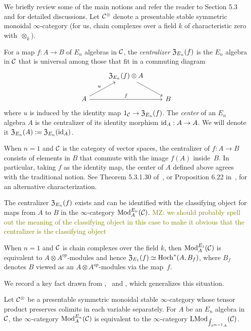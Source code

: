 \documentclass[11pt]{amsart}
\numberwithin{equation}{section}
\def\mahmoud{\textcolor{olive}{MZ: }\textcolor{olive}}
\begin{document}
We briefly review some of the main notions and refer the reader to \cite{LurieHA} Section 5.3 and \cite{FrancisHH} for detailed discussions. Let $\mathcal C^\otimes$ denote a presentable stable symmetric monoidal $\infty$-category (for us, chain complexes over a field $k$ of characteristic zero with~$\otimes_k$).

\begin{dfn}\label{D:centralizer}
For a map $f: A \to B$ of $E_n$ algebras in $\mathcal C$, 
the {\em centralizer} ${\frak Z}_{E_n}(f)$ is the $E_n$ algebra in $\mathcal C$ that is universal among those that fit in a commuting diagram
\[
\begin{tikzcd}
& {\frak Z}_{E_n}(f) \otimes A \arrow[dr] & \\
A \arrow[ur, "u"] \arrow[rr, "f"] && B
\end{tikzcd}
\]
where $u$ is induced by the identity map $1_\mathcal C \to {\frak Z}_{E_n}(f)$.
The {\em center} of an $E_n$ algebra $A$ is the centralizer of its identity morphism ${\rm id}_A: A \to A$. We will denote it ${\frak Z}_{E_n}(A) 
:= {\frak Z}_{E_n}({\rm id}_A)$.
\end{dfn}

When $n=1$ and $\mathcal C$ is the category of vector spaces, 
the centralizer of $f: A \to B$ consists of elements in $B$ that commute with the image $f(A)$ inside~$B$. 
In particular, taking $f$ as the identity map, 
the center of $A$ defined above agrees with the traditional notion. 
See Theorem 5.3.1.30 of~\cite{LurieHA}, or Proposition 6.22 in~\cite{GTZ3}, for an alternative characterization.

\begin{prp}\label{T:centralizer=inthom} 
The centralizer ${\frak Z}_{E_n}(f)$ exists and can be identified with the classifying object for maps from $A$ to $B$ in the $\infty$-category ${\rm Mod}^{E_n}_A(\mathcal C)$. \mahmoud{we should probably spell out the meaning of the classifying object in this case to make it obvious that the centralizer is the classifying object}
\end{prp} 

When $n=1$ and $\mathcal C$ is chain complexes over the field $k$, then ${\rm Mod}^{E_1}_A(\mathcal C)$ is equivalent to $A\otimes A^{op}$-modules and hence ${\frak Z}_{E_1}(f) \simeq {\rm Hoch}^*(A,B_f)$,
where $B_f$ denotes $B$ viewed as an $A\otimes A^{op}$-modules via the map~$f$.

We record a key fact drawn from \cite{LurieHA},~\cite{FrancisHH}  and \cite{GG-Notes}, which generalizes this situation.

\begin{prp}
\label{P:ModentoModSn}
Let $\mathcal C^\otimes$ be a presentable symmetric monoidal stable $\infty$-category whose tensor product preserves colimits in each variable separately.
For $A$ be an $E_n$ algebra in $\mathcal C$,
the $\infty$-category ${\rm Mod}^{E_n}_A(\mathcal C)$ is equivalent to the $\infty$-category ${\rm LMod}_{\int_{S^{n-1} A}}(\mathcal C)$.
\end{prp}
\end{document}
